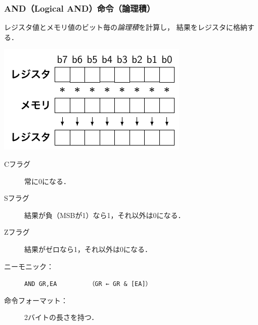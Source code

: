 \documentclass[handout]{beamer}        %
\begin{document}
\begin{frame}
  \frametitle{AND（Logical AND）命令（論理積）}
  \begin{minipage}{0.48\columnwidth}
  レジスタ値とメモリ値のビット毎の\emph{論理積}を計算し，
  結果をレジスタに格納する．
  \end{minipage}
  \begin{minipage}{0.48\columnwidth}
  \centerline{\includegraphics[scale=0.8]{../Tikz/land.pdf}}
  \end{minipage}
  \vfill
  \begin{description}
  \item[Cフラグ] 常に0になる．
  \item[Sフラグ] 結果が負（MSBが1）なら1，それ以外は0になる．
  \item[Zフラグ] 結果がゼロなら1，それ以外は0になる．
    \vfill
  \item[ニーモニック：]\texttt{AND GR,EA}~~~~~~~~~\texttt{（GR ← GR \& [EA]）}
    \vfill
  \item[命令フォーマット：] 2バイトの長さを持つ．\\
    {\small{}}
  \end{description}
  \vfill
\end{frame}
\end{document}
